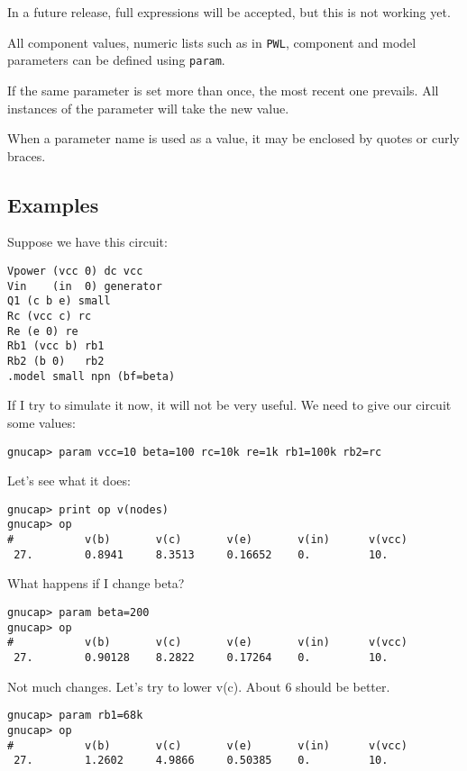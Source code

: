 In a future release, full expressions will be accepted, but this is
not working yet.

All component values, numeric lists such as in {\tt PWL}, component
and model parameters can be defined using {\tt param}.

If the same parameter is set more than once, the most recent one
prevails.  All instances of the parameter will take the new value.

When a parameter name is used as a value, it may be enclosed by quotes
or curly braces.
\subsection{Examples}

Suppose we have this circuit:

\begin{verbatim}
Vpower (vcc 0) dc vcc
Vin    (in  0) generator
Q1 (c b e) small
Rc (vcc c) rc
Re (e 0) re
Rb1 (vcc b) rb1
Rb2 (b 0)   rb2
.model small npn (bf=beta)
\end{verbatim}

If I try to simulate it now, it will not be very useful.  We need to
give our circuit some values:

\begin{verbatim}
gnucap> param vcc=10 beta=100 rc=10k re=1k rb1=100k rb2=rc
\end{verbatim}

Let's see what it does:

\begin{verbatim}
gnucap> print op v(nodes)
gnucap> op
#           v(b)       v(c)       v(e)       v(in)      v(vcc)    
 27.        0.8941     8.3513     0.16652    0.         10.       
\end{verbatim}

What happens if I change beta?

\begin{verbatim}
gnucap> param beta=200
gnucap> op
#           v(b)       v(c)       v(e)       v(in)      v(vcc)    
 27.        0.90128    8.2822     0.17264    0.         10.       
\end{verbatim}

Not much changes.  Let's try to lower v(c).  About 6 should be better.

\begin{verbatim}
gnucap> param rb1=68k
gnucap> op
#           v(b)       v(c)       v(e)       v(in)      v(vcc)    
 27.        1.2602     4.9866     0.50385    0.         10.       
\end{verbatim}

